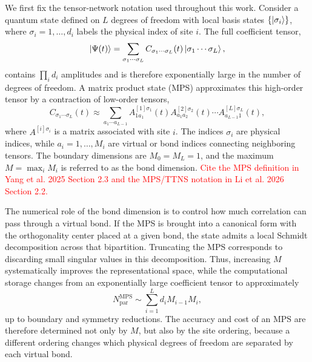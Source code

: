 \documentclass[journal=jctcce,manuscript=article]{achemso}
\newcommand{\placeholder}[1]{\textcolor{red}{#1}}
\begin{document}
We first fix the tensor-network notation used throughout this work. Consider a quantum state defined on \(L\) degrees of freedom with local basis states \(\{\ket{\sigma_i}\}\), where \(\sigma_i=1,\ldots,d_i\) labels the physical index of site \(i\). The full coefficient tensor,
\begin{equation}
    \ket{\Psi(t)} = \sum_{\sigma_1\cdots\sigma_L}
    C_{\sigma_1\cdots\sigma_L}(t)\ket{\sigma_1\cdots\sigma_L},
    \label{eq:full-mps-state}
\end{equation}
contains \(\prod_i d_i\) amplitudes and is therefore exponentially large in the number of degrees of freedom. A matrix product state (MPS) approximates this high-order tensor by a contraction of low-order tensors,
\begin{equation}
    C_{\sigma_1\cdots\sigma_L}(t) \approx
    \sum_{a_1\cdots a_{L-1}}
    A^{[1]\sigma_1}_{1a_1}(t)
    A^{[2]\sigma_2}_{a_1a_2}(t)
    \cdots
    A^{[L]\sigma_L}_{a_{L-1}1}(t),
    \label{eq:generic-mps}
\end{equation}
where \(A^{[i]\sigma_i}\) is a matrix associated with site \(i\). The indices \(\sigma_i\) are physical indices, while \(a_i=1,\ldots,M_i\) are virtual or bond indices connecting neighboring tensors. The boundary dimensions are \(M_0=M_L=1\), and the maximum \(M=\max_i M_i\) is referred to as the bond dimension. \placeholder{Cite the MPS definition in Yang et al. 2025 Section 2.3 and the MPS/TTNS notation in Li et al. 2026 Section 2.2.}

The numerical role of the bond dimension is to control how much correlation can pass through a virtual bond. If the MPS is brought into a canonical form with the orthogonality center placed at a given bond, the state admits a local Schmidt decomposition across that bipartition. Truncating the MPS corresponds to discarding small singular values in this decomposition. Thus, increasing \(M\) systematically improves the representational space, while the computational storage changes from an exponentially large coefficient tensor to approximately
\begin{equation}
    N_{\mathrm{par}}^{\mathrm{MPS}} \sim \sum_{i=1}^{L} d_i M_{i-1}M_i,
    \label{eq:mps-param-count}
\end{equation}
up to boundary and symmetry reductions. The accuracy and cost of an MPS are therefore determined not only by \(M\), but also by the site ordering, because a different ordering changes which physical degrees of freedom are separated by each virtual bond.
\end{document}
